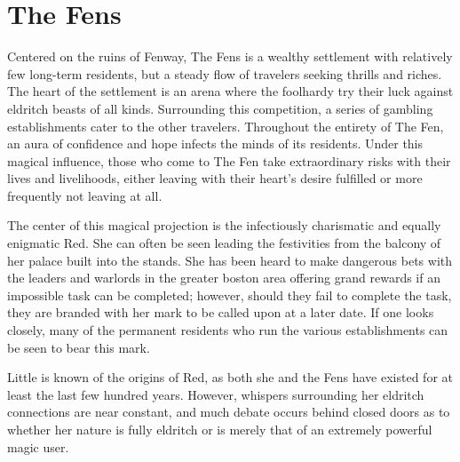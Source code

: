 \documentclass[././main.tex]{subfiles}
\begin{document}
\section{The Fens}
Centered on the ruins of Fenway, The Fens is a wealthy settlement with relatively few long-term residents, but a steady flow of travelers seeking thrills and riches. The heart of the settlement is an arena where the foolhardy try their luck against eldritch beasts of all kinds. Surrounding this competition, a series of gambling establishments cater to the other travelers. Throughout the entirety of The Fen, an aura of confidence and hope infects the minds of its residents. Under this magical influence, those who come to The Fen take extraordinary risks with their lives and livelihoods, either leaving with their heart's desire fulfilled or more frequently not leaving at all. 

The center of this magical projection is the infectiously charismatic and equally enigmatic Red. She can often be seen leading the festivities from the balcony of her palace built into the stands. She has been heard to make dangerous bets with the leaders and warlords in the greater boston area offering grand rewards if an impossible task can be completed; however, should they fail to complete the task, they are branded with her mark to be called upon at a later date. If one looks closely, many of the permanent residents who run the various establishments can be seen to bear this mark.

Little is known of the origins of Red, as both she and the Fens have existed for at least the last few hundred years. However, whispers surrounding her eldritch connections are near constant, and much debate occurs behind closed doors as to whether her nature is fully eldritch or is merely that of an extremely powerful magic user.
\end{document}
